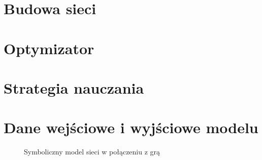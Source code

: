 \section{Budowa sieci}




\section{Optymizator}



\section{Strategia nauczania}



\section{Dane wejściowe i wyjściowe modelu}






\begin{figure}[h]
    \centering
    \caption{Symboliczny model sieci w połączeniu z grą}
    \label{img:rf_learning_diagram}
\end{figure}